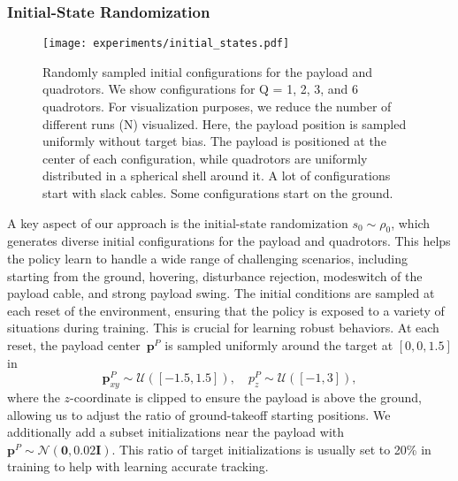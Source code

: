 \subsubsection{Initial-State Randomization}
\label{sec:reset}
\begin{figure}
    \centering
    \texttt{[image: experiments/initial\_states.pdf]}
    \caption[Initial States]{Randomly sampled initial configurations for the payload and quadrotors. We show configurations for Q = 1, 2, 3, and 6 quadrotors. For visualization purposes, we reduce the number of different runs (N) visualized. Here, the payload position is sampled uniformly without target bias. The payload is positioned at the center of each configuration, while quadrotors are uniformly distributed in a spherical shell around it. A lot of configurations start with slack cables. Some configurations start on the ground.}
    \label{fig:reset_config}
\end{figure}
A key aspect of our approach is the initial-state randomization $s_0\sim\rho_0$, which generates diverse initial configurations for the payload and quadrotors. This helps the policy learn to handle a wide range of challenging scenarios, including starting from the ground, hovering, disturbance rejection, modeswitch of the payload cable, and strong payload swing. The initial conditions are sampled at each reset of the environment, ensuring that the policy is exposed to a variety of situations during training. This is crucial for learning robust behaviors. 
At each reset, the payload center~$\mathbf{p}^P$ is sampled uniformly around the target at $[0,0,1.5]$ in
\begin{equation}
    \mathbf{p}^P_{xy}\sim\mathcal{U}([-1.5,1.5]),\quad p^P_z\sim\mathcal{U}([-1,3]),
\end{equation}
where the $z$-coordinate is clipped to ensure the payload is above the ground, allowing us to adjust the ratio of ground-takeoff starting positions. We additionally add a subset initializations near the payload with $\mathbf{p}^P\sim\mathcal{N}(\mathbf{0},0.02\mathbf{I})$. This ratio of target initializations is usually set to 20\% in training to help with learning accurate tracking.

